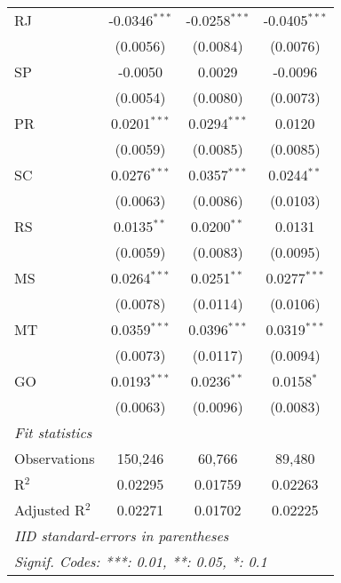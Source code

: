 \begin{tabular}{lccc}
   RJ              & -0.0346$^{***}$         & -0.0258$^{***}$         & -0.0405$^{***}$\\   
                   & (0.0056)                & (0.0084)                & (0.0076)\\   
   SP              & -0.0050                 & 0.0029                  & -0.0096\\   
                   & (0.0054)                & (0.0080)                & (0.0073)\\   
   PR              & 0.0201$^{***}$          & 0.0294$^{***}$          & 0.0120\\   
                   & (0.0059)                & (0.0085)                & (0.0085)\\   
   SC              & 0.0276$^{***}$          & 0.0357$^{***}$          & 0.0244$^{**}$\\   
                   & (0.0063)                & (0.0086)                & (0.0103)\\   
   RS              & 0.0135$^{**}$           & 0.0200$^{**}$           & 0.0131\\   
                   & (0.0059)                & (0.0083)                & (0.0095)\\   
   MS              & 0.0264$^{***}$          & 0.0251$^{**}$           & 0.0277$^{***}$\\   
                   & (0.0078)                & (0.0114)                & (0.0106)\\   
   MT              & 0.0359$^{***}$          & 0.0396$^{***}$          & 0.0319$^{***}$\\   
                   & (0.0073)                & (0.0117)                & (0.0094)\\   
   GO              & 0.0193$^{***}$          & 0.0236$^{**}$           & 0.0158$^{*}$\\   
                   & (0.0063)                & (0.0096)                & (0.0083)\\   
   \midrule
   \emph{Fit statistics}\\
   Observations    & 150,246                 & 60,766                  & 89,480\\  
   R$^2$           & 0.02295                 & 0.01759                 & 0.02263\\  
   Adjusted R$^2$  & 0.02271                 & 0.01702                 & 0.02225\\  
   \midrule \midrule
   \multicolumn{4}{l}{\emph{IID standard-errors in parentheses}}\\
   \multicolumn{4}{l}{\emph{Signif. Codes: ***: 0.01, **: 0.05, *: 0.1}}\\
\end{tabular}
\par\endgroup



